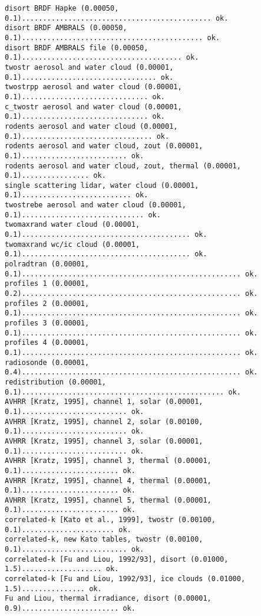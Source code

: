 \begin{enumerate}
\begin{lstlisting}[style=tinysize]
disort BRDF Hapke (0.00050,   0.1)............................................. ok.
disort BRDF AMBRALS (0.00050,   0.1)........................................... ok.
disort BRDF AMBRALS file (0.00050,   0.1)...................................... ok.
twostr aerosol and water cloud (0.00001,   0.1)................................ ok.
twostrpp aerosol and water cloud (0.00001,   0.1).............................. ok.
c_twostr aerosol and water cloud (0.00001,   0.1).............................. ok.
rodents aerosol and water cloud (0.00001,   0.1)............................... ok.
rodents aerosol and water cloud, zout (0.00001,   0.1)......................... ok.
rodents aerosol and water cloud, zout, thermal (0.00001,   0.1)................ ok.
single scattering lidar, water cloud (0.00001,   0.1).......................... ok.
twostrebe aerosol and water cloud (0.00001,   0.1)............................. ok.
twomaxrand water cloud (0.00001,   0.1)........................................ ok.
twomaxrand wc/ic cloud (0.00001,   0.1)........................................ ok.
polradtran (0.00001,   0.1).................................................... ok.
profiles 1 (0.00001,   0.2).................................................... ok.
profiles 2 (0.00001,   0.1).................................................... ok.
profiles 3 (0.00001,   0.1).................................................... ok.
profiles 4 (0.00001,   0.1).................................................... ok.
radiosonde (0.00001,   0.4).................................................... ok.
redistribution (0.00001,   0.1)................................................ ok.
AVHRR [Kratz, 1995], channel 1, solar (0.00001,   0.1)......................... ok.
AVHRR [Kratz, 1995], channel 2, solar (0.00100,   0.1)......................... ok.
AVHRR [Kratz, 1995], channel 3, solar (0.00001,   0.1)......................... ok.
AVHRR [Kratz, 1995], channel 3, thermal (0.00001,   0.1)....................... ok.
AVHRR [Kratz, 1995], channel 4, thermal (0.00001,   0.1)....................... ok.
AVHRR [Kratz, 1995], channel 5, thermal (0.00001,   0.1)....................... ok.
correlated-k [Kato et al., 1999], twostr (0.00100,   0.1)...................... ok.
correlated-k, new Kato tables, twostr (0.00100,   0.1)......................... ok.
correlated-k [Fu and Liou, 1992/93], disort (0.01000,   1.5)................... ok.
correlated-k [Fu and Liou, 1992/93], ice clouds (0.01000,   1.5)............... ok.
Fu and Liou, thermal irradiance, disort (0.00001,   0.9)....................... ok.

\end{lstlisting}
\end{enumerate}

